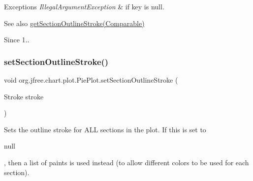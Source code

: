 \begin{DoxyExceptions}{Exceptions}
{\em Illegal\+Argument\+Exception} & if {\ttfamily key} is {\ttfamily null}.\\
\hline
\end{DoxyExceptions}
\begin{DoxySeeAlso}{See also}
\mbox{\hyperlink{classorg_1_1jfree_1_1chart_1_1plot_1_1_pie_plot_a5a568c273b4e925fd3c93647b806a9b9}{get\+Section\+Outline\+Stroke(\+Comparable)}}
\end{DoxySeeAlso}
\begin{DoxySince}{Since}
1.. 
\end{DoxySince}
\mbox{\label{classorg_1_1jfree_1_1chart_1_1plot_1_1_pie_plot_adc66765328e7ab87744e3d0cfbc84611}} 
\subsubsection{\texorpdfstring{set\+Section\+Outline\+Stroke()}{setSectionOutlineStroke()}\hspace{0.1cm}{\footnotesize\ttfamily [2/3]}}
{\footnotesize\ttfamily void org.\+jfree.\+chart.\+plot.\+Pie\+Plot.\+set\+Section\+Outline\+Stroke (\begin{DoxyParamCaption}\item[{Stroke}]{stroke }\end{DoxyParamCaption})}

Sets the outline stroke for A\+LL sections in the plot. If this is set to 
\begin{DoxyCode}
null 
\end{DoxyCode}
 , then a list of paints is used instead (to allow different colors to be used for each section).



